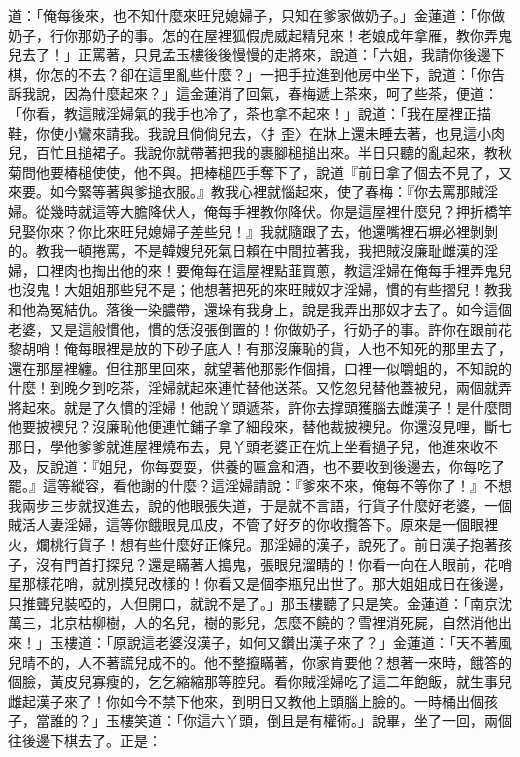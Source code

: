 道：「俺每後來，也不知什麼來旺兒媳婦子，只知在爹家做奶子。」金蓮道：「你做奶子，行你那奶子的事。怎的在屋裡狐假虎威起精兒來！老娘成年拿雁，教你弄鬼兒去了！」正罵著，只見孟玉樓後後慢慢的走將來，說道：「六姐，我請你後邊下棋，你怎的不去？卻在這里亂些什麼？」一把手拉進到他房中坐下，說道：「你告訴我說，因為什麼起來？」這金蓮消了回氣，春梅遞上茶來，呵了些茶，便道：「你看，教這賊淫婦氣的我手也冷了，茶也拿不起來！」說道：「我在屋裡正描鞋，你使小鸞來請我。我說且倘倘兒去，〈扌歪〉在牀上還未睡去著，也見這小肉兒，百忙且搥裙子。我說你就帶著把我的裹腳槌搥出來。半日只聽的亂起來，教秋菊問他要椿槌使使，他不與。把棒槌匹手奪下了，說道『前日拿了個去不見了，又來要。如今緊等著與爹搥衣服。』教我心裡就惱起來，使了春梅：『你去罵那賊淫婦。從幾時就這等大膽降伏人，俺每手裡教你降伏。你是這屋裡什麼兒？押折橋竿兒娶你來？你比來旺兒媳婦子差些兒！』我就隨跟了去，他還嘴裡石塀必裡剝剝的。教我一頓捲罵，不是韓嫂兒死氣日賴在中間拉著我，我把賊沒廉耻雌漢的淫婦，口裡肉也掏出他的來！要俺每在這屋裡點韮買蔥，教這淫婦在俺每手裡弄鬼兒也沒鬼！大姐姐那些兒不是；他想著把死的來旺賊奴才淫婦，慣的有些摺兒！教我和他為冤結仇。落後一染膿帶，還垛有我身上，說是我弄出那奴才去了。如今這個老婆，又是這般慣他，慣的恁沒張倒置的！你做奶子，行奶子的事。許你在跟前花黎胡哨！俺每眼裡是放的下砂子底人！有那沒廉恥的貨，人也不知死的那里去了，還在那屋裡纏。但往那里回來，就望著他那影作個揖，口裡一似嚼蛆的，不知說的什麼！到晚夕到吃茶，淫婦就起來連忙替他送茶。又忔忽兒替他蓋被兒，兩個就弄將起來。就是了久慣的淫婦！他說丫頭遞茶，許你去撑頭獲腦去雌漢子！是什麼問他要披襖兒？沒廉恥他便連忙鋪子拿了細段來，替他裁披襖兒。你還沒見哩，斷七那日，學他爹爹就進屋裡燒布去，見丫頭老婆正在炕上坐看撾子兒，他進來收不及，反說道：『姐兒，你每耍耍，供養的匾盒和酒，也不要收到後邊去，你每吃了罷。』這等縱容，看他謝的什麼？這淫婦請說：『爹來不來，俺每不等你了！』不想我兩步三步就扠進去，說的他眼張失道，于是就不言語，行貨子什麼好老婆，一個賊活人妻淫婦，這等你餓眼見瓜皮，不管了好歹的你收攬答下。原來是一個眼裡火，爛桃行貨子！想有些什麼好正條兒。那淫婦的漢子，說死了。前日漢子抱著孩子，沒有門首打探兒？還是瞞著人搗鬼，張眼兒溜睛的！你看一向在人眼前，花哨星那樣花哨，就別摸兒改樣的！你看又是個李瓶兒出世了。那大姐姐成日在後邊，只推聾兒裝啞的，人但開口，就說不是了。」那玉樓聽了只是笑。金蓮道：「南京沈萬三，北京枯柳樹，人的名兒，樹的影兒，怎麼不饒的？雪裡消死屍，自然消他出來！」玉樓道：「原說這老婆沒漢子，如何又鑽出漢子來了？」金蓮道：「天不著風兒晴不的，人不著謊兒成不的。他不整攛瞞著，你家肯要他？想著一來時，餓答的個臉，黃皮兒寡瘦的，乞乞縮縮那等腔兒。看你賊淫婦吃了這二年飽飯，就生事兒雌起漢子來了！你如今不禁下他來，到明日又教他上頭腦上臉的。一時桶出個孩子，當誰的？」玉樓笑道：「你這六丫頭，倒且是有權術。」說畢，坐了一回，兩個往後邊下棋去了。正是：

